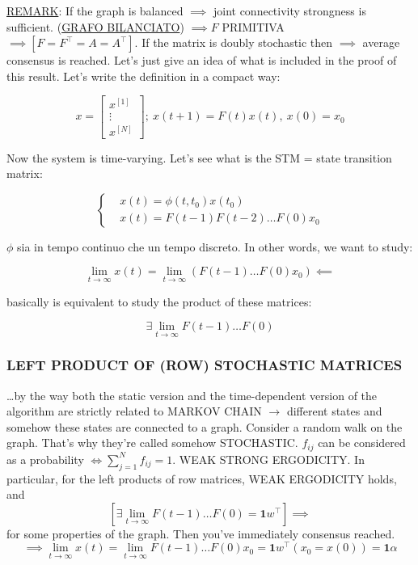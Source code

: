 \underline{REMARK}: If the graph is balanced $\implies$ \newline joint connectivity strongness is sufficient.
(\underline{GRAFO BILANCIATO}) $\implies F$ PRIMITIVA $\implies	[F=F^\top = A = A^\top]$.
If the matrix is doubly stochastic then $\implies$ average consensus is reached.
Let's just give an idea of what is included in the proof of this result. Let's write the definition in a compact way:

\[
	x = \begin{bmatrix}x^{[1]}\\ \vdots\\ x^{[N]}\end{bmatrix};\ x(t+1) = F(t)x(t),\ x(0)=x_0
\]

Now the system is time-varying. Let's see what is the STM = state transition matrix:

\[
	\left\{
	\begin{aligned}
	&x(t) = \phi(t,t_0)x(t_0)\\
	&x(t) = F(t-1)F(t-2)\dots F(0)x_0 
	\end{aligned} 
	\right.
\]

$\phi$ sia in tempo continuo che un tempo discreto. In other words, we want to study: 

\[
	\lim_{t\to\infty}{x(t)} = \lim_{t\to\infty}{(F(t-1)\dots F(0)x_0)} \impliedby
\]

basically is equivalent to study the product of these matrices:

\[
	\exists \lim_{t\to\infty}{F(t-1)\dots F(0)}
\]

\subsubsection{LEFT PRODUCT OF (ROW) STOCHASTIC MATRICES}

\dots by the way both the static version and the time-dependent version of the algorithm are strictly related to MARKOV CHAIN $\rightarrow$ different states and somehow these states are connected to a graph. Consider a random walk on the graph. That's why they're called somehow STOCHASTIC. $f_{ij}$ can be considered as a probability $\iff \sum_{j=1}^N{f_{ij}}=1$. WEAK STRONG ERGODICITY. In particular, for the left products of row matrices, WEAK ERGODICITY holds, and 
\[
	[\exists \lim_{t\to\infty}{F(t-1)\dots F(0)} = \mathbf{1}w^\top] \implies
\]
for some properties of the graph. Then you've immediately consensus reached. 
\[
	\implies \lim_{t\to\infty}{x(t)}=\lim_{t\to\infty}{F(t-1)\dots F(0)x_0} = \mathbf{1}w^\top (x_0=x(0)) = \mathbf{1}\alpha
\]

